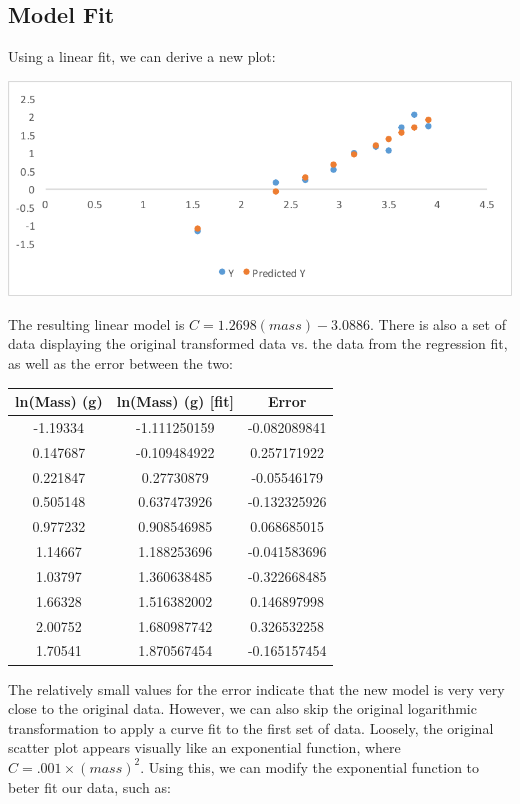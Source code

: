 \documentclass[10pt,letterpaper]{article}
\begin{document}
		\subsection{Model Fit}
			Using a linear fit, we can derive a new plot:
			\newline \newline
			\centerline{\includegraphics{Picture3.pdf}}
			\newline \newline
			The resulting linear model is $C = 1.2698(mass) - 3.0886$. There is also a set of data displaying the original transformed data vs. the data from the regression fit, as well as the error between the two:
			\begin{center}
				\begin{tabular}{c c c}
					ln(Mass) (g) & ln(Mass) (g) [fit] & Error \\
					\hline
					-1.19334 & -1.111250159 & -0.082089841 \\
					0.147687 & -0.109484922 & 0.257171922 \\
					0.221847 & 0.27730879 & -0.05546179 \\
					0.505148 & 0.637473926 & -0.132325926 \\
					0.977232 & 0.908546985 & 0.068685015 \\
					1.14667 & 1.188253696 & -0.041583696 \\
					1.03797 & 1.360638485 & -0.322668485 \\
					1.66328 & 1.516382002 & 0.146897998 \\
					2.00752 & 1.680987742 & 0.326532258 \\
					1.70541 & 1.870567454 & -0.165157454
				\end{tabular}
			\end{center}
			The relatively small values for the error indicate that the new model is very very close to the original data. However, we can also skip the original logarithmic transformation to apply a curve fit to the first set of data. Loosely, the original scatter plot appears visually like an exponential function, where $C = .001 \times (mass)^{2}$. Using this, we can modify the exponential function to beter fit our data, such as:
\end{document}
